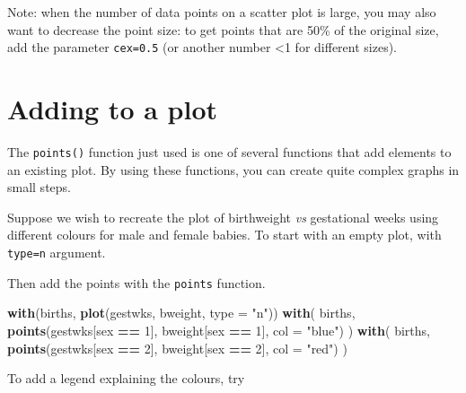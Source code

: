 \documentclass[
]{book}
\newenvironment{Shaded}{\begin{snugshade}}{\end{snugshade}}
\newcommand{\AttributeTok}[1]{\textcolor[rgb]{0.13,0.29,0.53}{#1}}
\newcommand{\DecValTok}[1]{\textcolor[rgb]{0.00,0.00,0.81}{#1}}
\newcommand{\FunctionTok}[1]{\textcolor[rgb]{0.13,0.29,0.53}{\textbf{#1}}}
\newcommand{\NormalTok}[1]{#1}
\newcommand{\SpecialCharTok}[1]{\textcolor[rgb]{0.81,0.36,0.00}{\textbf{#1}}}
\newcommand{\StringTok}[1]{\textcolor[rgb]{0.31,0.60,0.02}{#1}}
\begin{document}
Note: when the number of data points on a scatter plot is large, you may also want to decrease the point size: to get points that are 50\% of the original size, add the parameter \texttt{cex=0.5} (or another number \textless1 for different sizes).

\section{Adding to a plot}\label{adding-to-a-plot}

The \texttt{points()} function just used is one of several functions
that add elements to an existing plot. By using these functions, you
can create quite complex graphs in small steps.

Suppose we wish to recreate the plot of birthweight \emph{vs} gestational
weeks using different colours for male and female babies. To start with
an empty plot, with \texttt{type=\textquotesingle{}n\textquotesingle{}} argument.

Then add the points with the \texttt{points} function.

\begin{Shaded}
\begin{Highlighting}[]
\FunctionTok{with}\NormalTok{(births, }\FunctionTok{plot}\NormalTok{(gestwks, bweight, }\AttributeTok{type =} \StringTok{"n"}\NormalTok{))}
\FunctionTok{with}\NormalTok{(}
\NormalTok{  births, }
  \FunctionTok{points}\NormalTok{(gestwks[sex }\SpecialCharTok{==} \DecValTok{1}\NormalTok{], bweight[sex }\SpecialCharTok{==} \DecValTok{1}\NormalTok{], }\AttributeTok{col =} \StringTok{"blue"}\NormalTok{)}
\NormalTok{)}
\FunctionTok{with}\NormalTok{(}
\NormalTok{  births, }
  \FunctionTok{points}\NormalTok{(gestwks[sex }\SpecialCharTok{==} \DecValTok{2}\NormalTok{], bweight[sex }\SpecialCharTok{==} \DecValTok{2}\NormalTok{], }\AttributeTok{col =} \StringTok{"red"}\NormalTok{)}
\NormalTok{)}
\end{Highlighting}
\end{Shaded}

To add a legend explaining the colours, try
\end{document}
